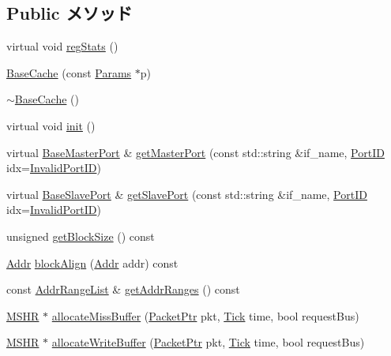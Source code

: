 \subsection*{Public メソッド}
\begin{DoxyCompactItemize}
\item 
virtual void \hyperlink{classBaseCache_a4dc637449366fcdfc4e764cdf12d9b11}{regStats} ()
\item 
\hyperlink{classBaseCache_a6c1d60cbb9ab660c557bca8bfb40d768}{BaseCache} (const \hyperlink{classBaseCache_a23c1728f4d2cabb1996560194937d427}{Params} $\ast$p)
\item 
\hyperlink{classBaseCache_a9864fcb9f5632b2c250c18a2f6b9ac46}{$\sim$BaseCache} ()
\item 
virtual void \hyperlink{classBaseCache_a02fd73d861ef2e4aabb38c0c9ff82947}{init} ()
\item 
virtual \hyperlink{classBaseMasterPort}{BaseMasterPort} \& \hyperlink{classBaseCache_adc4e675e51defbdd1e354dac729d0703}{getMasterPort} (const std::string \&if\_\-name, \hyperlink{base_2types_8hh_acef4d7d41cb21fdc252e20c04cd7bb8e}{PortID} idx=\hyperlink{base_2types_8hh_a65bf40f138cf863f0c5e2d8ca1144126}{InvalidPortID})
\item 
virtual \hyperlink{classBaseSlavePort}{BaseSlavePort} \& \hyperlink{classBaseCache_ac918a145092d7514ebc6dbd952dceafb}{getSlavePort} (const std::string \&if\_\-name, \hyperlink{base_2types_8hh_acef4d7d41cb21fdc252e20c04cd7bb8e}{PortID} idx=\hyperlink{base_2types_8hh_a65bf40f138cf863f0c5e2d8ca1144126}{InvalidPortID})
\item 
unsigned \hyperlink{classBaseCache_a38301abe4b3689f8ac7de5c13a046234}{getBlockSize} () const 
\item 
\hyperlink{base_2types_8hh_af1bb03d6a4ee096394a6749f0a169232}{Addr} \hyperlink{classBaseCache_a676df8321350e810fc857d99cdcebc22}{blockAlign} (\hyperlink{base_2types_8hh_af1bb03d6a4ee096394a6749f0a169232}{Addr} addr) const 
\item 
const \hyperlink{classstd_1_1list}{AddrRangeList} \& \hyperlink{classBaseCache_a030a5d76880e3d3187c9f46971525d09}{getAddrRanges} () const 
\item 
\hyperlink{classMSHR}{MSHR} $\ast$ \hyperlink{classBaseCache_ac37432bbe5fab7cdf422ee29acf155f2}{allocateMissBuffer} (\hyperlink{classPacket}{PacketPtr} pkt, \hyperlink{base_2types_8hh_a5c8ed81b7d238c9083e1037ba6d61643}{Tick} time, bool requestBus)
\item 
\hyperlink{classMSHR}{MSHR} $\ast$ \hyperlink{classBaseCache_a3f81ca9ba6f7294f930eca229838edc6}{allocateWriteBuffer} (\hyperlink{classPacket}{PacketPtr} pkt, \hyperlink{base_2types_8hh_a5c8ed81b7d238c9083e1037ba6d61643}{Tick} time, bool requestBus)

\end{DoxyCompactItemize}
